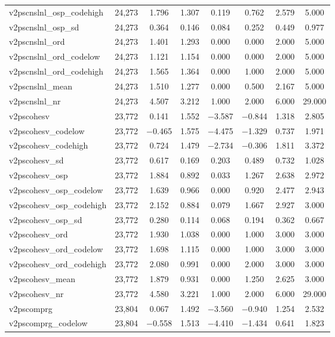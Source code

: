 \begin{table}[!htbp]
\begin{tabular}{@{\extracolsep{5pt}}lccccccc}
v2pscnslnl\_osp\_codehigh & 24,273 & 1.796 & 1.307 & 0.119 & 0.762 & 2.579 & 5.000 \\ 
v2pscnslnl\_osp\_sd & 24,273 & 0.364 & 0.146 & 0.084 & 0.252 & 0.449 & 0.977 \\ 
v2pscnslnl\_ord & 24,273 & 1.401 & 1.293 & 0.000 & 0.000 & 2.000 & 5.000 \\ 
v2pscnslnl\_ord\_codelow & 24,273 & 1.121 & 1.154 & 0.000 & 0.000 & 2.000 & 5.000 \\ 
v2pscnslnl\_ord\_codehigh & 24,273 & 1.565 & 1.364 & 0.000 & 1.000 & 2.000 & 5.000 \\ 
v2pscnslnl\_mean & 24,273 & 1.510 & 1.277 & 0.000 & 0.500 & 2.167 & 5.000 \\ 
v2pscnslnl\_nr & 24,273 & 4.507 & 3.212 & 1.000 & 2.000 & 6.000 & 29.000 \\ 
v2pscohesv & 23,772 & 0.141 & 1.552 & $-$3.587 & $-$0.844 & 1.318 & 2.805 \\ 
v2pscohesv\_codelow & 23,772 & $-$0.465 & 1.575 & $-$4.475 & $-$1.329 & 0.737 & 1.971 \\ 
v2pscohesv\_codehigh & 23,772 & 0.724 & 1.479 & $-$2.734 & $-$0.306 & 1.811 & 3.372 \\ 
v2pscohesv\_sd & 23,772 & 0.617 & 0.169 & 0.203 & 0.489 & 0.732 & 1.028 \\ 
v2pscohesv\_osp & 23,772 & 1.884 & 0.892 & 0.033 & 1.267 & 2.638 & 2.972 \\ 
v2pscohesv\_osp\_codelow & 23,772 & 1.639 & 0.966 & 0.000 & 0.920 & 2.477 & 2.943 \\ 
v2pscohesv\_osp\_codehigh & 23,772 & 2.152 & 0.884 & 0.079 & 1.667 & 2.927 & 3.000 \\ 
v2pscohesv\_osp\_sd & 23,772 & 0.280 & 0.114 & 0.068 & 0.194 & 0.362 & 0.667 \\ 
v2pscohesv\_ord & 23,772 & 1.930 & 1.038 & 0.000 & 1.000 & 3.000 & 3.000 \\ 
v2pscohesv\_ord\_codelow & 23,772 & 1.698 & 1.115 & 0.000 & 1.000 & 3.000 & 3.000 \\ 
v2pscohesv\_ord\_codehigh & 23,772 & 2.080 & 0.991 & 0.000 & 2.000 & 3.000 & 3.000 \\ 
v2pscohesv\_mean & 23,772 & 1.879 & 0.931 & 0.000 & 1.250 & 2.625 & 3.000 \\ 
v2pscohesv\_nr & 23,772 & 4.580 & 3.221 & 1.000 & 2.000 & 6.000 & 29.000 \\ 
v2pscomprg & 23,804 & 0.067 & 1.492 & $-$3.560 & $-$0.940 & 1.254 & 2.532 \\ 
v2pscomprg\_codelow & 23,804 & $-$0.558 & 1.513 & $-$4.410 & $-$1.434 & 0.641 & 1.823 \\ 

\end{tabular}
\end{table}
